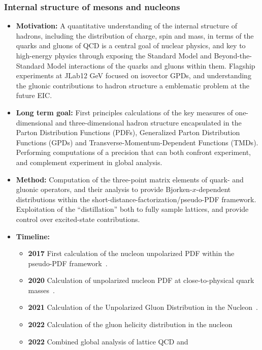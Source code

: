 \documentclass[12pt,hyperpdf]{article}
\begin{document}
\subsubsection{Internal structure of mesons and nucleons}\label{sec:meshadstruct}
\begin{itemize}
   \item{\bf Motivation:} A quantitative understanding of the internal
     structure of hadrons, including the distribution of charge, spin
     and mass, in terms of the quarks and gluons of QCD is a central
     goal of nuclear physics, and key to high-energy physics through
     exposing the Standard Model and Beyond-the-Standard Model
     interactions of the quarks and gluons within them.  Flagship
     experiments at JLab\@12 GeV focused on isovector GPDs, and
     understanding the gluonic contributions to hadron structure a
     emblematic problem at the future EIC.
   \item{\bf Long term goal:} First principles calculations of the key
     measures of one-dimensional and three-dimensional hadron
     structure encapsulated in the Parton Distribution Functions (PDFs),
     Generalized Parton Distribution Functions (GPDs) and
     Transverse-Momentum-Dependent Functions (TMDs).  Performing
     computations of a precision that can both confront experiment,
     and complement experiment in global analysis.
   \item{\bf Method:} Computation of the three-point matrix elements of quark- and
     gluonic operators, and their analysis to provide
     Bjorken-$x$-dependent distributions within the
     short-distance-factorization/pseudo-PDF framework.  Exploitation
     of the ``distillation'' both to fully sample lattices, and
     provide control over excited-state contributions.
\item{\bf Timeline:}
\begin{itemize}
   \item{\bf 2017} First calculation of the nucleon unpolarized PDF within
     the pseudo-PDF framework~\cite{Orginos:2017kos}.
   \item{\bf 2020} Calculation of unpolarized nucleon PDF at close-to-physical
     quark masses~\cite{Joo:2020spy}.
   \item{\bf 2021} Calculation of the Unpolarized Gluon Distribution in
     the Nucleon~\cite{HadStruc:2021wmh}.
   \item{\bf 2022} Calculation of the gluon helicity distribution in
     the nucleon~\cite{HadStruc:2022yaw}
   \item{\bf 2022} Combined global analysis of lattice QCD and

\end{itemize}
\end{itemize}
\end{document}
